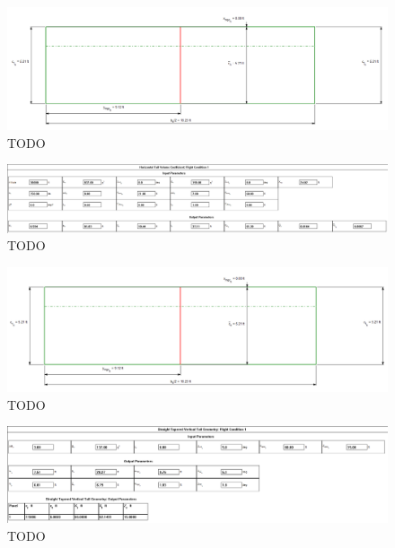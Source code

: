 \documentclass[conf]{new-aiaa}
\begin{document}
\begin{figure}
    \includegraphics[width=\textwidth]{Report3Printouts/Empannage/Horizontal_geometry_plot.png}
    \caption{TODO}
    \label{fig:TODO}
\end{figure}


\begin{figure}
    \includegraphics[width=\textwidth]{Report3Printouts/Empannage/Horizontal_volumeratio_cropped.png}
    \caption{TODO}
    \label{fig:TODO}
\end{figure}

\begin{figure}
    \includegraphics[width=\textwidth]{Report3Printouts/Empannage/Horizontal_volumeratio_plot.png}
    \caption{TODO}
    \label{fig:TODO}
\end{figure}


\begin{figure}
    \includegraphics[width=\textwidth]{Report3Printouts/Empannage/Vertical_geometry_cropped.png}
    \caption{TODO}
    \label{fig:TODO}
\end{figure}
\end{document}

